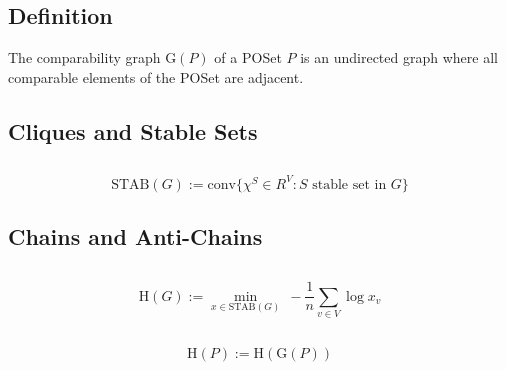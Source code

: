 \section{}
\subsection{Definition}

The comparability graph $\text{G}(P)$ of a POSet $P$ is an undirected graph where all comparable elements of the POSet are adjacent.

\subsection{Cliques and Stable Sets}



\subsection{}
\begin{equation}
\text{STAB}(G) := \text{conv}\{\chi^S \in R^V : S\text{ stable set in }G\}
\label{eq:stab}
\end{equation}

\subsection{Chains and Anti-Chains}

\subsection{}
\begin{equation}
\text{H}(G) := \min_{x \in \text{STAB}(G)}~ -\frac{1}{n} \sum_{v \in V} \log x_v
\label{eq:entropy:graph}
\end{equation}

\subsection{}
\begin{equation}
\text{H}(P) := \text{H}(\text{G}(P))
\label{eq:entropy:poset}
\end{equation}
